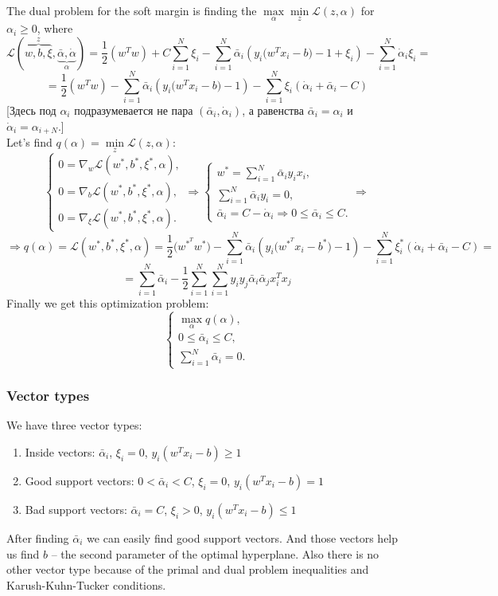 The dual problem for the soft margin is finding the $\max\limits_{\alpha}\min\limits_{z}\mathcal{L}(z,\alpha)$ for $\alpha_i\ge0$, where
$$\mathcal{L}(\overbrace{w,b,\xi}^{z},\underbrace{\bar\alpha,\dot\alpha}_{\alpha})=\frac{1}{2}(w^Tw)+C\sum\limits_{i=1}^{N}\xi_i-\sum\limits_{i=1}^{N}\bar\alpha_i(y_i\big(w^Tx_i-b\big)-1+\xi_i)-\sum\limits_{i=1}^{N}\dot\alpha_i\xi_i=$$
$$=\frac{1}{2}(w^Tw)-\sum\limits_{i=1}^{N}\bar\alpha_i(y_i\big(w^Tx_i-b\big)-1)-\sum\limits_{i=1}^{N}\xi_i(\dot\alpha_i+\bar\alpha_i-C)$$
[Здесь под $\alpha_i$ подразумевается не пара $(\bar\alpha_i,\dot\alpha_i)$, а равенства $\bar\alpha_i = \alpha_i$ и $\dot\alpha_i=\alpha_{i+N}$.]\\
Let's find $q(\alpha)=\min\limits_{z}\mathcal{L}(z,\alpha)$:
$$\begin{cases}
	0=\nabla_w\mathcal{L}(w^*,b^*,\xi^*,\alpha), \\
	0=\nabla_b\mathcal{L}(w^*,b^*,\xi^*,\alpha), \\
	0=\nabla_\xi\mathcal{L}(w^*,b^*,\xi^*,\alpha).
\end{cases}\Longrightarrow
\begin{cases}
	w^*=\sum\limits_{i=1}^{N}\bar\alpha_iy_ix_i, \\
	\sum\limits_{i=1}^{N}\bar\alpha_iy_i=0, \\
	\bar\alpha_i=C-\dot\alpha_i\Rightarrow 0\le\bar\alpha_i\le C.
\end{cases}\Longrightarrow$$
$$\Longrightarrow q(\alpha)=\mathcal{L}(w^*,b^*,\xi^*,\alpha)=\frac{1}{2}\big(w^{*^T}w^*\big)-\sum\limits_{i=1}^{N}\bar\alpha_i(y_i\big(w^{*^T}x_i-b^*\big)-1)-\sum\limits_{i=1}^{N}\xi_i^*(\dot\alpha_i+\bar\alpha_i-C)=$$
$$=\sum\limits_{i=1}^{N}\bar\alpha_i-\frac{1}{2}\sum\limits_{i=1}^{N}\sum\limits_{i=1}^{N}y_iy_j\bar\alpha_i\bar\alpha_jx_i^Tx_j$$
Finally we get this optimization problem:
$$\begin{cases}
	\max\limits_{\alpha}q(\alpha), \\
	0\le\bar\alpha_i\le C, \\
	\sum\limits_{i=1}^{N}\bar\alpha_i=0.
\end{cases}$$

\subsubsection*{Vector types}

We have three vector types:
\begin{enumerate}[label=\arabic*.]
	\item Inside vectors: $\bar\alpha_i$, $\xi_i=0$, $y_i(w^Tx_i-b)\ge1$
	\item Good support vectors: $0<\bar\alpha_i<C$, $\xi_i=0$, $y_i(w^Tx_i-b)=1$
	\item Bad support vectors: $\bar\alpha_i=C$, $\xi_i>0$, $y_i(w^Tx_i-b)\le1$
\end{enumerate}
After finding $\bar\alpha_i$ we can easily find good support vectors. And those vectors help us find $b$ -- the second parameter of the optimal hyperplane. Also there is no other vector type because of the primal and dual problem inequalities and Karush-Kuhn-Tucker conditions.

